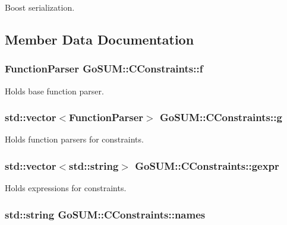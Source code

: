 Boost serialization. 



\subsection{Member Data Documentation}
\hypertarget{class_go_s_u_m_1_1_c_constraints_a9205ec417c8870e9f4b5001db082d782}{
\subsubsection[{f}]{\setlength{\rightskip}{0pt plus 5cm}Function\-Parser Go\-S\-U\-M\-::\-C\-Constraints\-::f\hspace{0.3cm}{\ttfamily [protected]}}}\label{class_go_s_u_m_1_1_c_constraints_a9205ec417c8870e9f4b5001db082d782}


Holds base function parser. 

\hypertarget{class_go_s_u_m_1_1_c_constraints_ac862006b869d239f27b466a6e0cfabb2}{
\subsubsection[{g}]{\setlength{\rightskip}{0pt plus 5cm}std\-::vector$<$Function\-Parser$>$ Go\-S\-U\-M\-::\-C\-Constraints\-::g\hspace{0.3cm}{\ttfamily [protected]}}}\label{class_go_s_u_m_1_1_c_constraints_ac862006b869d239f27b466a6e0cfabb2}
Holds function parsers for constraints. \hypertarget{class_go_s_u_m_1_1_c_constraints_a9a560b064cc42cd4c9447d3891cf2f65}{
\subsubsection[{gexpr}]{\setlength{\rightskip}{0pt plus 5cm}std\-::vector$<$std\-::string$>$ Go\-S\-U\-M\-::\-C\-Constraints\-::gexpr\hspace{0.3cm}{\ttfamily [protected]}}}\label{class_go_s_u_m_1_1_c_constraints_a9a560b064cc42cd4c9447d3891cf2f65}


Holds expressions for constraints. 

\hypertarget{class_go_s_u_m_1_1_c_constraints_a94ad221dd1376199a48858e01fc6e19e}{
\subsubsection[{names}]{\setlength{\rightskip}{0pt plus 5cm}std\-::string Go\-S\-U\-M\-::\-C\-Constraints\-::names\hspace{0.3cm}{\ttfamily [protected]}}}\label{class_go_s_u_m_1_1_c_constraints_a94ad221dd1376199a48858e01fc6e19e}


